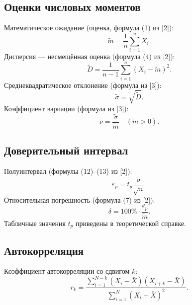 \documentclass[a4paper,12pt]{article}
\begin{document}
\subsection{Оценки числовых моментов}
Математическое ожидание (оценка, формула (1) из [2]):
\begin{equation}\label{eq:ref_m}
\tilde{m} = \frac{1}{n}\sum_{i=1}^{n} X_i.
\end{equation}
Дисперсия — несмещённая оценка (формула (4) из [2]):
\begin{equation}\label{eq:ref_D}
\tilde{D} = \frac{1}{n-1}\sum_{i=1}^{n}(X_i - \tilde{m})^2.
\end{equation}
Среднеквадратическое отклонение (формула из [3]):
\begin{equation}\label{eq:ref_sigma}
\tilde{\sigma} = \sqrt{\tilde{D}}.
\end{equation}
Коэффициент вариации (формула из [3]):
\begin{equation}\label{eq:ref_nu}
\nu = \frac{\tilde{\sigma}}{\tilde{m}} \quad (\tilde{m}>0).
\end{equation}

\subsection{Доверительный интервал}
Полуинтервал (формулы (12)–(13) из [2]):
\begin{equation}\label{eq:ref_epsilon}
\varepsilon_p = t_p \frac{\tilde{\sigma}}{\sqrt{n}}.
\end{equation}
Относительная погрешность (формула (7) из [2]):
\begin{equation}\label{eq:ref_delta}
\delta = 100\% \cdot \frac{\varepsilon_p}{\tilde{m}}.
\end{equation}
Табличные значения $t_p$ приведены в теоретической справке.

\subsection{Автокорреляция}
Коэффициент автокорреляции со сдвигом $k$:
\begin{equation}\label{eq:ref_ac}
r_k = \frac{\sum_{i=1}^{N-k}(X_i - \bar{X})(X_{i+k} - \bar{X})}{\sum_{i=1}^{N}(X_i - \bar{X})^2}.
\end{equation}
\end{document}
